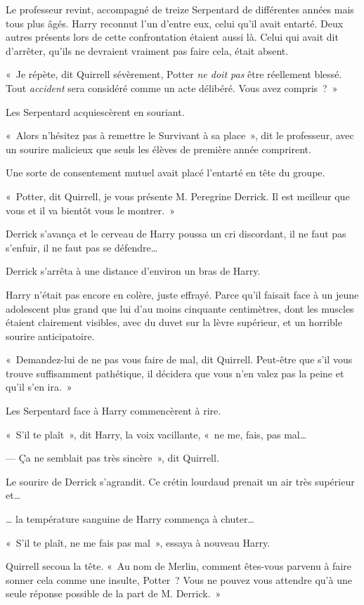 Le professeur revint, accompagné de treize Serpentard de différentes années mais tous plus âgés.
Harry reconnut l'un d'entre eux, celui qu'il avait entarté.
Deux autres présents lors de cette confrontation étaient aussi là.
Celui qui avait dit d'arrêter, qu'ils ne devraient vraiment pas faire cela, était absent.

«~Je répète, dit Quirrell sévèrement, Potter \emph{ne doit pas} être réellement blessé.
Tout \emph{accident} sera considéré comme un acte délibéré.
Vous avez compris~?~»

Les Serpentard acquiescèrent en souriant.

«~Alors n'hésitez pas à remettre le Survivant à sa place~», dit le professeur, avec un sourire malicieux que seuls les élèves de première année comprirent.

Une sorte de consentement mutuel avait placé l'entarté en tête du groupe.

«~Potter, dit Quirrell, je vous présente M. Peregrine Derrick.
Il est meilleur que vous et il va bientôt vous le montrer.~»

Derrick s'avança et le cerveau de Harry poussa un cri discordant, il ne faut pas s'enfuir, il ne faut pas se défendre…

Derrick s'arrêta à une distance d'environ un bras de Harry.

Harry n'était pas encore en colère, juste effrayé.
Parce qu'il faisait face à un jeune adolescent plus grand que lui d'au moins cinquante centimètres, dont les muscles étaient clairement visibles, avec du duvet sur la lèvre supérieur, et un horrible sourire anticipatoire.

«~Demandez-lui de ne pas vous faire de mal, dit Quirrell.
Peut-être que s'il vous trouve suffisamment pathétique, il décidera que vous n'en valez pas la peine et qu'il s'en ira.~»

Les Serpentard face à Harry commencèrent à rire.

«~S'il te plaît~», dit Harry, la voix vacillante, «~ne me, fais, pas mal…

--- Ça ne semblait pas très sincère~», dit Quirrell.

Le sourire de Derrick s'agrandit.
Ce crétin lourdaud prenait un air très supérieur et…

… la température sanguine de Harry commença à chuter…

«~S'il te plaît, ne me fais pas mal~», essaya à nouveau Harry.

Quirrell secoua la tête.
«~Au nom de Merlin, comment êtes-vous parvenu à faire sonner cela comme une insulte, Potter~?
Vous ne pouvez vous attendre qu'à une seule réponse possible de la part de M. Derrick.~»

